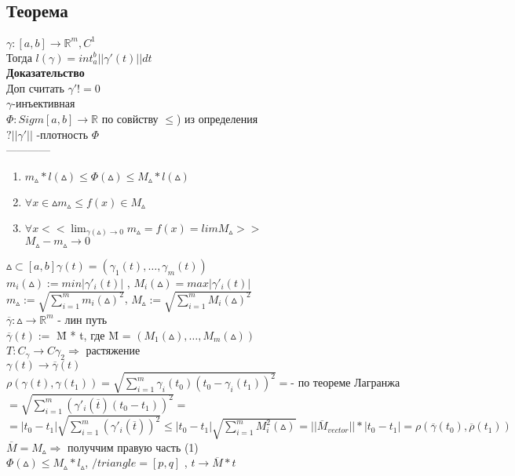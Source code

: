 \documentclass[12pt, a4paper]{article}
\begin{document}
 \subsection{Теорема}
    $\gamma : [a,b] \rightarrow \mathbb{R}^m, C^1$\\
    Тогда $l(\gamma)=int_{a}^{b}||\gamma'(t)|| dt $\\
 \textbf{Доказательство}\\
    Доп считать $\gamma' != 0 $\\
    $\gamma$-инъективная\\
    $\Phi: Sigm[a,b] \rightarrow \mathbb{R}$ по совйству $\leq$) из    определения\\
     $?||\gamma'||$ -плотность $\Phi$\\
     ------------\\
  \begin{enumerate}
    \item   
        $m_{\vartriangle}*l(\vartriangle) \leq \Phi(\vartriangle)\leq     M_\vartriangle*l(\vartriangle)$ \\
    \item
        $\forall x \in \vartriangle  m_\vartriangle \leq f(x) \in M_\vartriangle$ \\
    \item
        $\forall x  << \lim_{\gamma(\vartriangle)\rightarrow 0}  m_\vartriangle =f(x) = lim M_\vartriangle >>$ \\
        $M_\vartriangle -m_\vartriangle \rightarrow 0$ \\
  \end{enumerate}
  $\vartriangle \subset [a,b] \gamma(t)=(\gamma_1(t),\dots,\gamma_m(t))$\\
  $m_i(\vartriangle):= min|\gamma'_i(t)|$ ,   $M_i(\vartriangle)=max|\gamma'_i(t)|$\\
  $m_\vartriangle := \sqrt{\sum_{i=1}^m m_i(\vartriangle)^2}$,   
  $M_\vartriangle:=\sqrt{\sum_{i=1}^m M_i(\vartriangle)^2} $\\
  $ \overline\gamma : \vartriangle \rightarrow \mathbb{R}^m$ - лин путь \\
  $\overline\gamma(t):=$ \=M * t, где \=M = $(M_1(\vartriangle),\dots,M_m(\vartriangle))$ \\
  $T:C_\gamma \rightarrow C \gamma_2 \Rightarrow$ растяжение \\
  $\gamma(t) \rightarrow \overline\gamma(t)$ \\
  $\rho(\gamma(t),\gamma(t_1))=\sqrt{\sum_{i=1}^{m}\gamma_i({ t_0})(t_0-\gamma_i(t_1))^2}=$- по теореме Лагранжа\\
  $=\sqrt{\sum_{i=1}^{m}(\gamma'_i(\overline t)(t_0 - t_1))^2} = $
  $=|t_0 -t_1|\sqrt{\sum_{i=1}^{m}(\gamma'_i(\overline t))^2} \leq |t_0 - t_1| \sqrt{\sum_{i=1}^{m}M_{i}^2(\vartriangle)} = ||\overline M_{vector}||*|t_0 - t_1| = \rho(\overline \gamma(t_0),\overline\rho(t_1))$\\
  $\overline M = M_{\vartriangle} \Rightarrow$ получчим правую часть (1)\\
  $\Phi(\vartriangle)\leq M_\vartriangle * l_\vartriangle$,   $/triangle =[p,q]$ ,   $t \rightarrow \overline M*t$ \\
\end{document}
